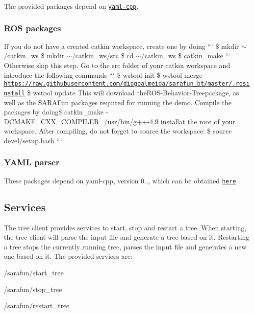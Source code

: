 The provided packages depend on \href{https://github.com/oftc/yaml-cpp.git}{\tt yaml-\/cpp}.

\subsubsection*{R\-O\-S packages}

If you do not have a created catkin workspace, create one by doing ``` \$ mkdir $\sim$/catkin\-\_\-ws \$ mkdir $\sim$/catkin\-\_\-ws/src \$ cd $\sim$/catkin\-\_\-ws \$ catkin\-\_\-make ``` Otherwise skip this step. Go to the src folder of your catkin workspace and introduce the following commands ``` \$ wstool init \$ wstool merge \href{https://raw.githubusercontent.com/diogoalmeida/sarafun_bt/master/.rosinstall}{\tt https\-://raw.\-githubusercontent.\-com/diogoalmeida/sarafun\-\_\-bt/master/.\-rosinstall} \$ wstool update {\ttfamily  This will download the}R\-O\-S-\/\-Behavior-\/\-Tree{\ttfamily package, as well as the S\-A\-R\-A\-Fun packages required for running the demo. Compile the packages by doing}\$ catkin\-\_\-make -\/\-D\-C\-M\-A\-K\-E\-\_\-\-C\-X\-X\-\_\-\-C\-O\-M\-P\-I\-L\-E\-R=/usr/bin/g++-\/4.9 install{\ttfamily at the root of your workspace. After compiling, do not forget to source the workspace\-: } \$ source devel/setup.\-bash ```

\subsubsection*{Y\-A\-M\-L parser}

These packages depend on yaml-\/cpp, version 0.., which can be obtained \href{https://github.com/jbeder/yaml-cpp/tree/yaml-cpp-0.5.3}{\tt here}

\subsection*{Services }

The tree client provides services to start, stop and restart a tree. When starting, the tree client will parse the input file and generate a tree based on it. Restarting a tree stops the currently running tree, parses the input file and generates a new one based on it. The provided services are\-:
\begin{DoxyItemize}
\item {\ttfamily /sarafun/start\-\_\-tree}
\item {\ttfamily /sarafun/stop\-\_\-tree}
\item {\ttfamily /sarafun/restart\-\_\-tree}
\end{DoxyItemize}


